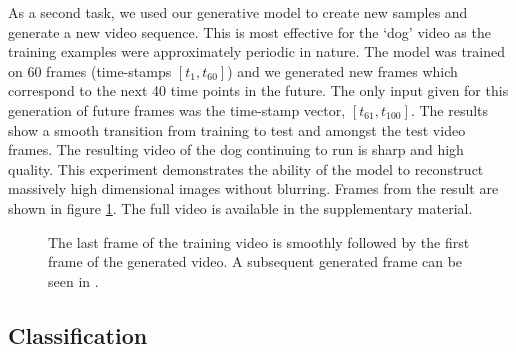 \par As a second task, we used our generative model to create new
samples and generate a new video sequence. This is most effective for
the `dog' video as the training examples were approximately periodic
in nature. The model was trained on 60 frames (time-stamps $[t_1,
t_{60}]$) and we generated new frames which correspond to the next
40 time points in the future. The only input given for this generation
of future frames was the time-stamp vector, $[t_{61}, t_{100}]$. The
results show a smooth transition from training to test and amongst the
test video frames. The resulting video of the dog continuing to run is
sharp and high quality. This experiment demonstrates the ability of
the model to reconstruct massively high dimensional images without
blurring. Frames from the result are shown in figure
\ref{fig:dog}. The full video is available in the supplementary
material.


\begin{figure}[ht]
\begin{center}
\end{center}
\caption{ \small{
The last frame of the training video  is smoothly followed by the first frame  of the generated video. A subsequent generated frame can be seen in }.}
\label{fig:dog}
\end{figure}


\subsection{Classification}

